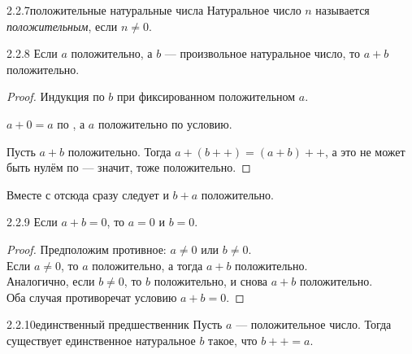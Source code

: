 \begin{definition}{2.2.7}{положительные натуральные числа}
Натуральное число $n$ называется \emph{положительным}, если $n \neq 0$.
\end{definition}

\begin{proposition}{2.2.8}{}
Если $a$ положительно, а $b$ — произвольное натуральное число, то $a+b$ положительно.
\end{proposition}

\begin{proof}
Индукция по $b$ при фиксированном положительном $a$.

 $a+0=a$ по , а $a$ положительно по
условию.

 Пусть $a+b$ положительно. Тогда $a+(b{+}{+})=(a+b){+}{+}$, а это не
может быть нулём по  — значит, тоже положительно.
\end{proof}

\begin{remark}
Вместе с  отсюда сразу следует и $b+a$ положительно.
\end{remark}

\begin{corollary}{2.2.9}{}
Если $a+b=0$, то $a=0$ и $b=0$.
\end{corollary}

\begin{proof}
Предположим противное: $a \neq 0$ или $b \neq 0$.\\
Если $a \neq 0$, то $a$ положительно, а тогда $a+b$ положительно.\\
Аналогично, если $b \neq 0$, то $b$ положительно, и снова $a+b$ положительно.\\
Оба случая противоречат условию $a+b=0$.
\end{proof}

\begin{lemma}{2.2.10}{единственный предшественник}
Пусть $a$ — положительное число. Тогда существует единственное натуральное $b$ такое, что
$b{+}{+}=a$.
\end{lemma}

